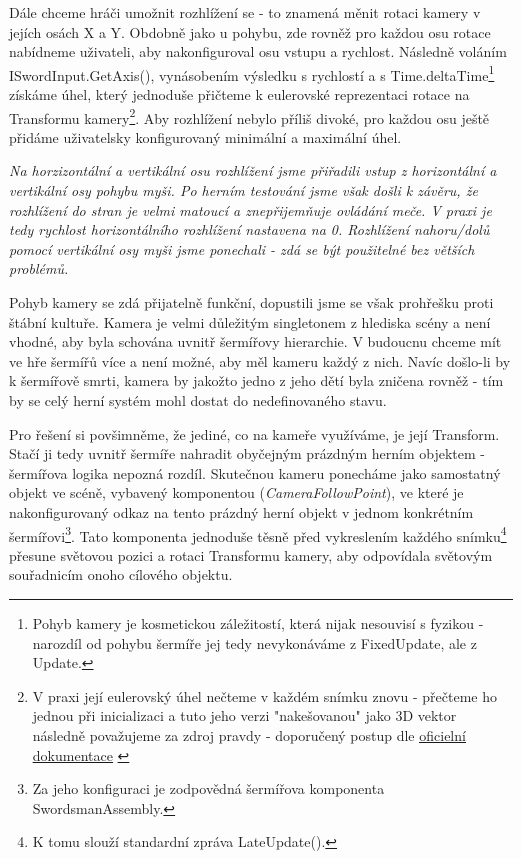 Dále chceme hráči umožnit rozhlížení se - to znamená měnit rotaci kamery v jejích osách X a Y. Obdobně jako u pohybu, zde rovněž pro každou osu rotace nabídneme uživateli, aby nakonfiguroval osu vstupu a rychlost. Následně voláním ISwordInput.GetAxis(), vynásobením výsledku s rychlostí a s Time.deltaTime\footnote{Pohyb kamery je kosmetickou záležitostí, která nijak nesouvisí s fyzikou - narozdíl od pohybu šermíře jej tedy nevykonáváme z FixedUpdate, ale z Update.} získáme úhel, který jednoduše přičteme k eulerovské reprezentaci rotace na Transformu kamery\footnote{V praxi její eulerovský úhel nečteme v každém snímku znovu - přečteme ho jednou při inicializaci a tuto jeho verzi "nakešovanou" jako 3D vektor následně považujeme za zdroj pravdy - doporučený postup dle \href{https://docs.unity3d.com/2022.2/Documentation/ScriptReference/Quaternion-eulerAngles.html}{\underline{oficielní dokumentace}} \cite{Unity}}. Aby rozhlížení nebylo příliš divoké, pro každou osu ještě přidáme uživatelsky konfigurovaný minimální a maximální úhel.

\textit{Na horzizontální a vertikální osu rozhlížení jsme přiřadili vstup z horizontální a vertikální osy pohybu myši. Po herním testování jsme však došli k závěru, že rozhlížení do stran je velmi matoucí a znepřijemňuje ovládání meče. V praxi je tedy rychlost horizontálního rozhlížení nastavena na 0. Rozhlížení nahoru/dolů pomocí vertikální osy myši jsme ponechali - zdá se být použitelné bez větších problémů.}

Pohyb kamery se zdá přijatelně funkční, dopustili jsme se však prohřešku proti štábní kultuře. Kamera je velmi důležitým singletonem z hlediska scény a není vhodné, aby byla schována uvnitř šermířovy hierarchie. V budoucnu chceme mít ve hře šermířů více a není možné, aby měl kameru každý z nich. Navíc došlo-li by k šermířově smrti, kamera by jakožto jedno z jeho dětí byla zničena rovněž - tím by se celý herní systém mohl dostat do nedefinovaného stavu.

Pro řešení si povšimněme, že jediné, co na kameře využíváme, je její Transform. Stačí ji tedy uvnitř šermíře nahradit obyčejným prázdným herním objektem - šermířova logika nepozná rozdíl. Skutečnou kameru ponecháme jako samostatný objekt ve scéně, vybavený komponentou (\textit{CameraFollowPoint}), ve které je nakonfigurovaný odkaz na tento prázdný herní objekt v jednom konkrétním šermířovi\footnote{Za jeho konfiguraci je zodpovědná šermířova komponenta SwordsmanAssembly.}. Tato komponenta jednoduše těsně před vykreslením každého snímku\footnote{K tomu slouží standardní zpráva LateUpdate().} přesune světovou pozici a rotaci Transformu kamery, aby odpovídala světovým souřadnicím onoho cílového objektu. 

